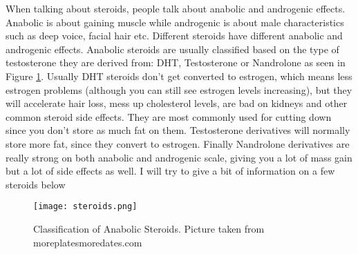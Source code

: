 \documentclass[openany, 12pt]{book}
\begin{document}
        When talking about steroids, people talk about anabolic and androgenic effects. Anabolic is about gaining muscle while androgenic is about male characteristics such as deep voice, facial hair etc.
        Different steroids have different anabolic and androgenic effects.
        Anabolic steroids are usually classified based on the type of testosterone they are derived from: DHT, Testosterone or Nandrolone as seen in Figure \ref{fig9}.
        Usually DHT steroids don't get converted to estrogen, which means less estrogen problems (although you can still see estrogen levels increasing), but they will accelerate hair loss,
        mess up cholesterol levels, are bad on kidneys and other common steroid side effects. They are most commonly used for cutting down since you don't store as much fat on them.
        Testosterone derivatives will normally store more fat, since they convert to estrogen. Finally Nandrolone derivatives are really strong on both anabolic and androgenic scale, giving you a lot of
        mass gain but a lot of side effects as well.
        I will try to give a bit of information on a few steroids below

	\begin{figure}[h]
		\centering
		\texttt{[image: steroids.png]}
		\caption{Classification of Anabolic Steroids. Picture taken from moreplatesmoredates.com}
		\label{fig9}
	\end{figure}
\end{document}
